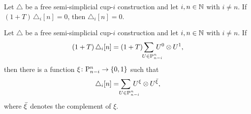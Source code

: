 \begin{corollary}\label{c:free_zero}
	Let $\triangle$ be a free semi-simplicial \mbox{cup-$i$} construction and let $i, n \in \mathbb{N}$ with $i \neq n$.
	If $(1+T)\,\triangle_i[n] = 0$, then $\triangle_i[n] = 0$.
\end{corollary}

\begin{corollary}\label{c:free_xi}
	Let $\triangle$ be a free semi-simplicial \mbox{cup-$i$} construction and let $i, n \in \mathbb{N}$ with $i \neq n$.
	If
	\[
	(1+T)\,\triangle_i[n] = (1+T)\sum_{\mathclap{\quad U \in \P^n_{n-i}}} \, U^0 \ot U^1,
	\]
	then there is a function $\xi \colon \mathrm{P}^n_{n-i} \to \{0,1\}$ such that
	\[
	\triangle_i[n] = \sum_{\mathclap{\quad U \in \P^n_{n-i}}} \, U^\xi \ot U^\barxi,
	\]
	where ${\bar{\xi}}$ denotes the complement of $\xi$.
\end{corollary}
